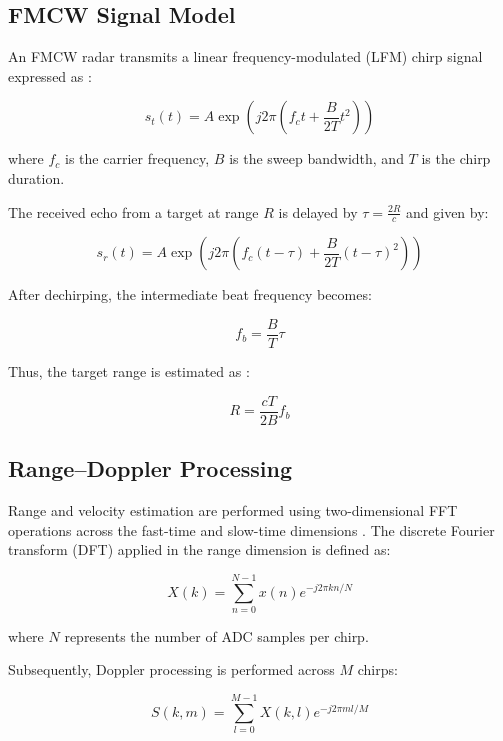 \documentclass[conference, a4paper]{IEEEtran}
\begin{document}
\subsection{FMCW Signal Model}

An FMCW radar transmits a linear frequency-modulated (LFM) chirp signal expressed as \cite{richards2014}:

\begin{equation}
s_t(t) = A \exp \left( j 2\pi \left( f_c t + \frac{B}{2T} t^2 \right) \right)
\end{equation}

where $f_c$ is the carrier frequency, $B$ is the sweep bandwidth, and $T$ is the chirp duration.

The received echo from a target at range $R$ is delayed by $\tau = \frac{2R}{c}$ and given by:

\begin{equation}
s_r(t) = A \exp \left( j 2\pi \left( f_c (t-\tau) + \frac{B}{2T} (t-\tau)^2 \right) \right)
\end{equation}

After dechirping, the intermediate beat frequency becomes:

\begin{equation}
f_b = \frac{B}{T} \tau
\end{equation}

Thus, the target range is estimated as \cite{richards2014}:

\begin{equation}
R = \frac{cT}{2B} f_b
\end{equation}

\subsection{Range–Doppler Processing}

Range and velocity estimation are performed using two-dimensional FFT operations across the fast-time and slow-time dimensions \cite{richards2014}. The discrete Fourier transform (DFT) applied in the range dimension is defined as:

\begin{equation}
X(k) = \sum_{n=0}^{N-1} x(n) e^{-j 2\pi kn/N}
\end{equation}

where $N$ represents the number of ADC samples per chirp.

Subsequently, Doppler processing is performed across $M$ chirps:

\begin{equation}
S(k,m) = \sum_{l=0}^{M-1} X(k,l) e^{-j 2\pi ml/M}
\end{equation}
\end{document}
